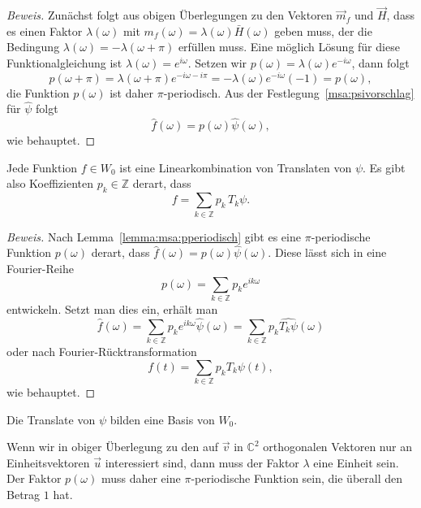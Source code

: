 \begin{proof}[Beweis]
Zunächst folgt aus obigen Überlegungen zu den Vektoren $\vec{m}_f$ und
$\vec{H}$, dass es einen Faktor $\lambda(\omega)$ mit
$m_f(\omega)=\lambda(\omega)\bar{H}(\omega)$ geben muss, der die
Bedingung $\lambda(\omega)=-\lambda(\omega+\pi)$ erfüllen muss.
Eine möglich Lösung für diese Funktionalgleichung ist
$\lambda(\omega)=e^{i\omega}$.
Setzen wir $p(\omega) = \lambda(\omega)e^{-i\omega}$, dann folgt
\[
p(\omega+\pi) = \lambda(\omega+\pi)e^{-i\omega-i\pi}
=-\lambda(\omega)e^{-i\omega} (-1) = p(\omega),
\]
die Funktion $p(\omega)$ ist daher $\pi$-periodisch.
Aus der Festlegung~\ref{msa:psivorschlag} für $\hat{\psi}$ folgt
\[
\hat{f}(\omega)= p(\omega)\hat{\psi}(\omega),
\]
wie behauptet.
\end{proof}

\begin{lemma}
Jede Funktion $f\in W_0$ ist eine Linearkombination von Translaten von $\psi$.
Es gibt also Koeffizienten $p_k\in\mathbb Z$ derart, dass 
\[
f = \sum_{k\in\mathbb Z} p_k\,T_k\psi.
\]
\end{lemma}

\begin{proof}[Beweis]
Nach Lemma~\eqref{lemma:msa:pperiodisch} gibt es eine $\pi$-periodische
Funktion $p(\omega)$ derart, dass $\hat{f}(\omega)=p(\omega)\hat{\psi}(\omega)$.
Diese lässt sich in eine Fourier-Reihe 
\[
p(\omega) = \sum_{k\in\mathbb Z} p_k e^{ik\omega} 
\]
entwickeln.
Setzt man dies ein, erhält man
\[
\hat{f}(\omega)
=
\sum_{k\in\mathbb Z} p_k e^{ik\omega} \hat{\psi}(\omega)
=
\sum_{k\in\mathbb Z} p_k \widehat{T_k\psi}(\omega)
\]
oder nach Fourier-Rücktransformation
\[
f(t) = \sum_{k\in\mathbb Z} p_k T_k\psi(t),
\]
wie behauptet.
\end{proof}

\begin{lemma}
Die Translate von $\psi$ bilden eine Basis von $W_0$.
\end{lemma}

Wenn wir in obiger Überlegung zu den auf $\vec{v}$ in $\mathbb C^2$
orthogonalen Vektoren nur an Einheitsvektoren $\vec{u}$
interessiert sind,
dann muss der Faktor $\lambda$ eine Einheit sein.
Der Faktor $p(\omega)$ muss daher eine $\pi$-periodische Funktion
sein, die überall den Betrag $1$ hat.

%
%
